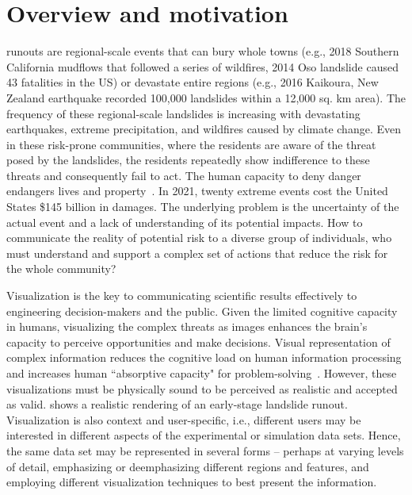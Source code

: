 \documentclass[journal]{IEEEtran}
\begin{document}
\section{Overview and motivation}
 runouts are regional-scale events that can bury whole towns (e.g., 2018 Southern California mudflows that followed a series of wildfires, 2014 Oso landslide caused 43 fatalities in the US) or devastate entire regions (e.g., 2016 Kaikoura, New Zealand earthquake recorded 100,000 landslides within a 12,000 sq. km area). The frequency of these regional-scale landslides is increasing with devastating earthquakes, extreme precipitation, and wildfires caused by climate change. Even in these risk-prone communities, where the residents are aware of the threat posed by the landslides, the residents repeatedly show indifference to these threats and consequently fail to act. The human capacity to deny danger endangers lives and property~\cite{kim2020public}. In 2021, twenty extreme events cost the United States \$145 billion in damages. The underlying problem is the uncertainty of the actual event and a lack of understanding of its potential impacts. How to communicate the reality of potential risk to a diverse group of individuals, who must understand and support a complex set of actions that reduce the risk for the whole community?
  
Visualization is the key to communicating scientific results effectively to engineering decision-makers and the public. Given the limited cognitive capacity in humans, visualizing the complex threats as images enhances the brain's capacity to perceive opportunities and make decisions. Visual representation of complex information reduces the cognitive load on human information processing and increases human ``absorptive capacity" for problem-solving~\cite{kahneman2012human}. However, these visualizations must be physically sound to be perceived as realistic and accepted as valid.   shows a realistic rendering of an early-stage landslide runout. Visualization is also context and user-specific, i.e., different users may be interested in different aspects of the experimental or simulation data sets. Hence, the same data set may be represented in several forms – perhaps at varying levels of detail, emphasizing or deemphasizing different regions and features, and employing different visualization techniques to best present the information.
\end{document}
